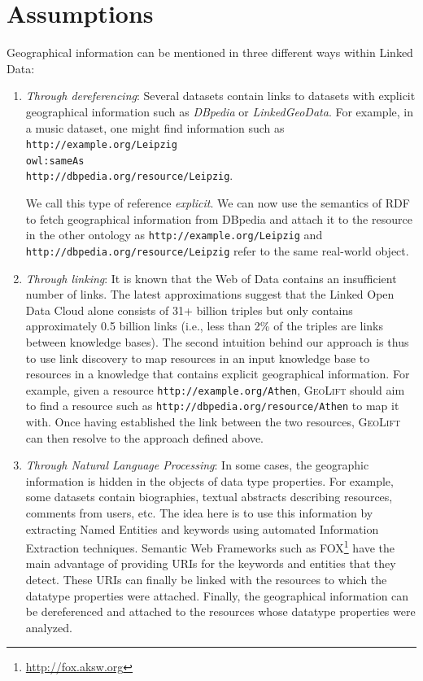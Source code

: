 \documentclass[a4paper,twoside,bibtotoc,abstracton,12pt,BCOR=15mm]{article}
\newcommand{\geolift}{\textsc{GeoLift}\xspace}
\begin{document}
\section{Assumptions}
Geographical information can be mentioned in three different ways within Linked Data:
\begin{enumerate}
\item \emph{Through dereferencing}: Several datasets contain links to datasets with explicit geographical information such as \emph{DBpedia} or \emph{LinkedGeoData}. 
For example, in a music dataset, one might find information such as\\ 
\texttt{http://example.org/Leipzig \\
owl:sameAs \\ 
http://dbpedia.org/resource/Leipzig}.

We call this type of reference \emph{explicit}. 
We can now use the semantics of RDF to fetch geographical information from DBpedia and attach it to the resource in the other ontology as \texttt{http://example.org/Leipzig} and \texttt{http://dbpedia.org/resource/Leipzig} refer to the same real-world object.

\item \emph{Through linking}: It is known that the Web of Data contains an insufficient number of links. 
The latest approximations suggest that the Linked Open Data Cloud alone consists of 31+ billion triples but only contains approximately 0.5 billion links (i.e., less than 2\% of the triples are links between knowledge bases). 
The second intuition behind our approach is thus to use link discovery to map resources in an input knowledge base to resources in a knowledge that contains explicit geographical information. 
For example, given a resource \texttt{http://example.org/Athen}, \geolift should aim to find a resource such as \texttt{http://dbpedia.org/resource/Athen} to map it with. 
Once having established the link between the two resources, \geolift can then resolve to the approach defined above.

\item \emph{Through Natural Language Processing}: In some cases, the geographic information is hidden in the objects of data type properties. 
For example, some datasets contain biographies, textual abstracts describing resources, comments from users, etc.
The idea here is to use this information by extracting Named Entities and keywords using automated Information Extraction techniques.
Semantic Web Frameworks such as FOX\footnote{\url{http://fox.aksw.org}} have the main advantage of providing URIs for the keywords and entities that they detect.
These URIs can finally be linked with the resources to which the datatype properties were attached.
Finally, the geographical information can be dereferenced and attached to the resources whose datatype properties were analyzed.
\end{enumerate}
\end{document}
